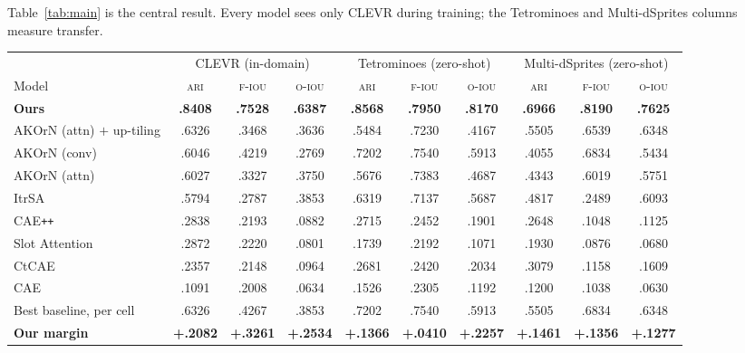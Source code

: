 Table~\ref{tab:main} is the central result. Every model sees only CLEVR during training; the
Tetrominoes and Multi-dSprites columns measure transfer.

\begin{table}[!t]
\centering
\small
\setlength{\tabcolsep}{4pt}
\begin{tabular}{l ccc ccc ccc}
\toprule
& \multicolumn{3}{c}{CLEVR (in-domain)} & \multicolumn{3}{c}{Tetrominoes (zero-shot)} & \multicolumn{3}{c}{Multi-dSprites (zero-shot)} \\
\cmidrule(lr){2-4}\cmidrule(lr){5-7}\cmidrule(lr){8-10}
Model & \textsc{ari} & \textsc{f-iou} & \textsc{o-iou} & \textsc{ari} & \textsc{f-iou} & \textsc{o-iou} & \textsc{ari} & \textsc{f-iou} & \textsc{o-iou} \\
\midrule
\textbf{Ours} & \textbf{.8408} & \textbf{.7528} & \textbf{.6387} & \textbf{.8568} & \textbf{.7950} & \textbf{.8170} & \textbf{.6966} & \textbf{.8190} & \textbf{.7625} \\
\midrule
AKOrN (attn) $+$ up-tiling & .6326 & .3468 & .3636 & .5484 & .7230 & .4167 & .5505 & .6539 & .6348 \\
AKOrN (conv)               & .6046 & .4219 & .2769 & .7202 & .7540 & .5913 & .4055 & .6834 & .5434 \\
AKOrN (attn)               & .6027 & .3327 & .3750 & .5676 & .7383 & .4687 & .4343 & .6019 & .5751 \\
ItrSA                      & .5794 & .2787 & .3853 & .6319 & .7137 & .5687 & .4817 & .2489 & .6093 \\
CAE\texttt{++}             & .2838 & .2193 & .0882 & .2715 & .2452 & .1901 & .2648 & .1048 & .1125 \\
Slot Attention             & .2872 & .2220 & .0801 & .1739 & .2192 & .1071 & .1930 & .0876 & .0680 \\
CtCAE                      & .2357 & .2148 & .0964 & .2681 & .2420 & .2034 & .3079 & .1158 & .1609 \\
CAE                        & .1091 & .2008 & .0634 & .1526 & .2305 & .1192 & .1200 & .1038 & .0630 \\
\midrule
Best baseline, per cell    & .6326 & .4267 & .3853 & .7202 & .7540 & .5913 & .5505 & .6834 & .6348 \\
\textbf{Our margin}        & \textbf{+.2082} & \textbf{+.3261} & \textbf{+.2534} & \textbf{+.1366} & \textbf{+.0410} & \textbf{+.2257} & \textbf{+.1461} & \textbf{+.1356} & \textbf{+.1277} \\
\bottomrule
\end{tabular}

\end{table}
